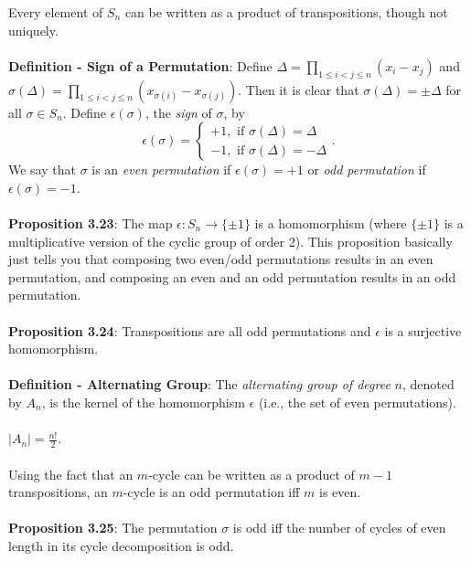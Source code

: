 \documentclass{article}
\begin{document}
Every element of $S_n$ can be written as a product of transpositions, though not uniquely. \\ \\
\textbf{Definition - Sign of a Permutation}: Define $\Delta = \prod_{1 \leq i < j \leq n} (x_i - x_j)$ and $\sigma(\Delta) = \prod_{1 \leq i < j \leq n} (x_{\sigma(i)} - x_{\sigma(j)})$. Then it is clear that $\sigma(\Delta) = \pm \Delta$ for all $\sigma \in S_n$. Define $\epsilon(\sigma)$, the \textit{sign} of $\sigma$, by $$\epsilon(\sigma) = \begin{cases}
    +1, \text{ if } \sigma(\Delta) = \Delta \\
    -1, \text{ if } \sigma(\Delta) = -\Delta
\end{cases}.$$ We say that $\sigma$ is an \textit{even permutation} if $\epsilon(\sigma) = +1$ or \textit{odd permutation} if $\epsilon(\sigma) = -1$. \\ \\
\textbf{Proposition 3.23}: The map $\epsilon : S_n \rightarrow \{\pm 1\}$ is a homomorphism (where $\{\pm 1\}$ is a multiplicative version of the cyclic group of order 2). This proposition basically just tells you that composing two even/odd permutations results in an even permutation, and composing an even and an odd permutation results in an odd permutation. \\ \\
\textbf{Proposition 3.24}: Transpositions are all odd permutations and $\epsilon$ is a surjective homomorphism. \\ \\
\textbf{Definition - Alternating Group}: The \textit{alternating group of degree} $n$, denoted by $A_n$, is the kernel of the homomorphism $\epsilon$ (i.e., the set of even permutations). \\ \\
$|A_n| = \frac{n!}{2}$. \\ \\
Using the fact that an $m$-cycle can be written as a product of $m - 1$ transpositions, an $m$-cycle is an odd permutation iff $m$ is even. \\ \\
\textbf{Proposition 3.25}: The permutation $\sigma$ is odd iff the number of cycles of even length in its cycle decomposition is odd.
\end{document}
